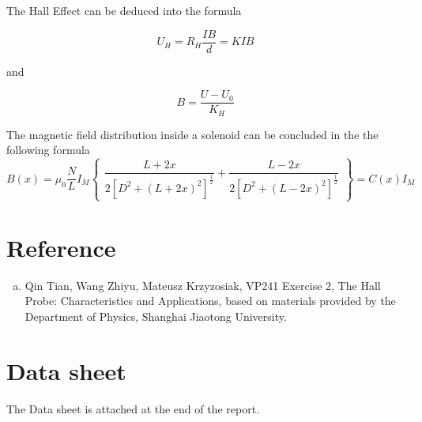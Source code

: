 \documentclass{article}
\begin{document}
The Hall Effect can be deduced into the formula

$$U_H=R_H\dfrac{IB}{d}=KIB$$

and

$$B=\dfrac{U-U_0}{K_H}$$

The magnetic field distribution inside a solenoid can be concluded in the the following formula
\begin{equation*}
	B(x)=\mu_0\dfrac{N}{L}I_M\begin{Bmatrix}
	\dfrac{L+2x}{2[D^2+(L+2x)^2]^{\frac{1}{2}}}+\dfrac{L-2x}{2[D^2+(L-2x)^2]^{\frac{1}{2}}}
	\end{Bmatrix}=C(x)I_M
\end{equation*}

\section{Reference}

\begin{enumerate}[(a)]
	\item
	Qin Tian, Wang Zhiyu, Mateusz Krzyzosiak, VP241 Exercise 2, The Hall Probe: Characteristics and Applications, based on materials provided by the Department of Physics, Shanghai Jiaotong University.
\end{enumerate}

\section{Data sheet}

The Data sheet is attached at the end of the report.
\end{document}

